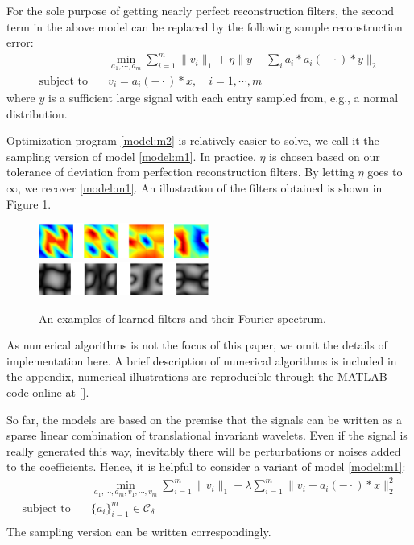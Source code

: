 \documentclass[a4paper]{article}
\begin{document}
\begin{rem}
	For the sole purpose of getting nearly perfect reconstruction filters, the second term in the above model can be replaced by the following sample reconstruction error:
\begin{equation}
	\begin{aligned}
		&\min_{a_1,\cdots,a_m} \sum_{i=1}^m \|v_i\|_1 + \eta \|y-\sum_i a_i*a_i(-\cdot)*y\|_2 \\
		\textrm{subject to} \quad &v_i = a_i(-\cdot)*x,\quad i=1,\cdots,m
	\end{aligned}
\end{equation}
where $y$ is a sufficient large signal with each entry sampled from, e.g., a normal distribution.
\end{rem}
Optimization program \eqref{model:m2} is relatively easier to solve, we call it the sampling version of model \eqref{model:m1}. In practice, $\eta$ is chosen based on our tolerance of deviation from perfection reconstruction filters. By letting $\eta$ goes to $\infty$, we recover \eqref{model:m1}.  An illustration of the filters obtained is shown in Figure 1.
\begin{figure}[h!]
    \centering
    \includegraphics[width=0.5\textwidth]{fig11.eps}
  \includegraphics[width=0.5\textwidth]{fig12.eps}
    \caption{An examples of learned filters and their Fourier spectrum.}
    \label{fig:1}
\end{figure}

As numerical algorithms is not the focus of this paper, we omit the details of implementation here. A brief description of numerical algorithms is included in the appendix, numerical illustrations are reproducible through the MATLAB code online at []. 


So far, the models are based on the premise that the signals can be written as a sparse linear combination of translational invariant wavelets. Even if the signal is really generated this way, inevitably there will be perturbations or noises added to the coefficients. Hence, it is helpful to consider a variant of model \eqref{model:m1}:
\begin{equation}
\label{model:m3}
	\begin{aligned}
		&\min_{a_1,\cdots,a_m,v_1,\cdots,v_m} \sum_{i=1}^m \|v_i\|_1  + \lambda \sum_{i=1}^m \|v_i - a_i(-\cdot)*x\|_2^2\\
		\textrm{subject to} \quad& \{a_i\}_{i=1}^m \in \mathcal{C_\delta} \\		 
	\end{aligned}
\end{equation}
The sampling version can be written correspondingly.
\end{document}
